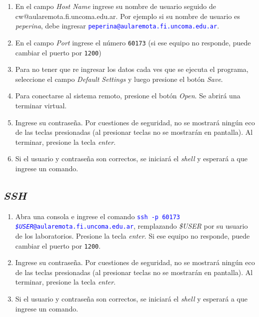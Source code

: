 \documentclass[12pt]{article}
\newcommand{\cw}[1]{\texttt{\textcolor{blue}{#1}}}
\begin{document}
\begin{enumerate}
\begin{figure}[!htb]
\end{figure}


    \item En el campo \emph{Host Name} ingrese su nombre de usuario seguido de
        \\cw{@aularemota.fi.uncoma.edu.ar}. Por ejemplo si su nombre de
        usuario es \emph{peperina}, debe ingresar
        \cw{peperina@aularemota.fi.uncoma.edu.ar}.

    \item En el campo \emph{Port} ingrese el número \texttt{60173} (si ese
        equipo no responde, puede cambiar el puerto por \texttt{1200})

    \item Para no tener que re ingresar los datos cada ves que se ejecuta el
        programa, seleccione el campo \emph{Default Settings} y luego presione
        el botón \emph{Save}.

    \item Para conectarse al sistema remoto, presione el botón \emph{Open}. Se
        abrirá una terminar virtual.

    \item Ingrese su contraseña. Por cuestiones de seguridad, no se mostrará
        ningún eco de las teclas presionadas (al presionar teclas no se
        mostrarán en pantalla). Al terminar, presione la tecla 
        \emph{enter}.

    \item Si el usuario y contraseña son correctos, se iniciará el
        \emph{shell} y esperará a que ingrese un comando.

\end{enumerate}

\subsection*{\emph{SSH}}

\begin{enumerate}
    \item Abra una consola e ingrese el comando \cw{ssh -p 60173
        \emph{\$USER}@aularemota.fi.uncoma.edu.ar}, remplazando \emph{\$USER}
        por su usuario de los laboratorios. Presione la tecla \emph{enter}. Si
        ese equipo no responde, puede cambiar el puerto por
        \texttt{1200}.

    \item Ingrese su contraseña. Por cuestiones de seguridad, no se mostrará
        ningún eco de las teclas presionadas (al presionar teclas no se
        mostrarán en pantalla). Al terminar, presione la tecla 
        \emph{enter}.

    \item Si el usuario y contraseña son correctos, se iniciará el
        \emph{shell} y esperará a que ingrese un comando.

\end{enumerate}
\end{document}
